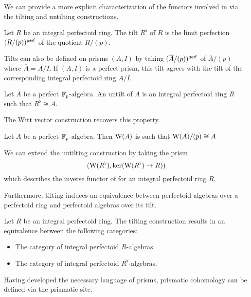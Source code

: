 We can provide a more explicit characterization of the functors involved in  via the tilting and untilting constructions. 
\begin{definition}[Tilt]\label{def: tilt}
    Let $R$ be an integral perfectoid ring. The tilt $R^{\flat}$ of $R$ is the limit perfection $(R/(p))^{\mathsf{perf}}$ of the quotient $R/(p)$. 
\end{definition}
\begin{remark}
    Tilts can also be defined on prisms $(A,I)$ by taking $(\overline{A}/(p))^{\mathsf{perf}}$ of $\overline{A}/(p)$ where $\overline{A}=A/I$. If $(A,I)$ is a perfect prism, this tilt agrees with the tilt of the corresponding integral perfectoid ring $A/I$.
\end{remark}
\begin{definition}[Untilt]\label{def: untilt}
    Let $A$ be a perfect $\mathbb{F}_{p}$-algebra. An untilt of $A$ is an integral perfectoid ring $R$ such that $R^{\flat}\cong A$. 
\end{definition}
The Witt vector construction recovers this property. 
\begin{proposition}\label{prop: untilt is Witt vectors}
    Let $A$ be a perfect $\mathbb{F}_{p}$-algebra. Then $\mathrm{W}(A)$ is such that $\mathrm{W}(A)/(p)\cong A$
\end{proposition}
We can extend the untilting construction by taking the prism 
$$(\mathrm{W}(R^{\flat}), \ker(\mathrm{W}(R^{\flat})\to R))$$ 
which describes the inverse functor of  for an integral perfectoid ring $R$. 

Furthermore, tilting induces an equivalence between perfectoid algebras over a perfectoid ring and perfectoid algebras over its tilt. 
\begin{proposition}\label{prop: tilting correspondence}
    Let $R$ be an integral perfectoid ring. The tilting construction results in an equivalence between the following categories:
    \begin{itemize}
        \item The category of integral perfectoid $R$-algebras. 
        \item The category of integral perfectoid $R^{\flat}$-algebras. 
    \end{itemize}
\end{proposition}
Having developed the necessary language of prisms, prismatic cohomology can be defined via the prismatic site. 